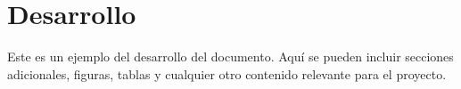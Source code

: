 \section{Desarrollo}

Este es un ejemplo del desarrollo del documento. Aquí se pueden incluir secciones adicionales, figuras, tablas y cualquier otro contenido relevante para el proyecto.
